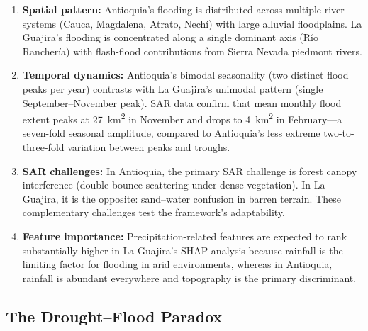 \documentclass{article}
\begin{document}
\begin{enumerate}
    \item \textbf{Spatial pattern:} Antioquia's flooding is distributed across multiple river systems (Cauca, Magdalena, Atrato, Nech\'i) with large alluvial floodplains. La Guajira's flooding is concentrated along a single dominant axis (R\'io Rancher\'ia) with flash-flood contributions from Sierra Nevada piedmont rivers.
    \item \textbf{Temporal dynamics:} Antioquia's bimodal seasonality (two distinct flood peaks per year) contrasts with La Guajira's unimodal pattern (single September--November peak). SAR data confirm that mean monthly flood extent peaks at \SI{27}{\kilo\metre\squared} in November and drops to \SI{4}{\kilo\metre\squared} in February---a seven-fold seasonal amplitude, compared to Antioquia's less extreme two-to-three-fold variation between peaks and troughs.
    \item \textbf{SAR challenges:} In Antioquia, the primary SAR challenge is forest canopy interference (double-bounce scattering under dense vegetation). In La Guajira, it is the opposite: sand--water confusion in barren terrain. These complementary challenges test the framework's adaptability.
    \item \textbf{Feature importance:} Precipitation-related features are expected to rank substantially higher in La Guajira's SHAP analysis because rainfall is the limiting factor for flooding in arid environments, whereas in Antioquia, rainfall is abundant everywhere and topography is the primary discriminant.
\end{enumerate}

\subsection{The Drought--Flood Paradox}
\end{document}
